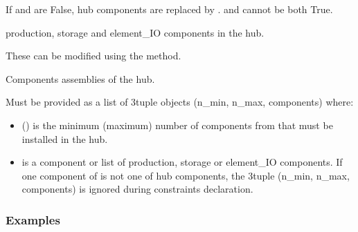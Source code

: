 \documentclass[letterpaper,10pt,english]{sphinxmanual}
\begin{document}
\begin{fulllineitems}
\begin{fulllineitems}
\sphinxAtStartPar
If  and  are False, hub components are replaced by .
 and  cannot be both True.

\end{fulllineitems}


\begin{fulllineitems}
\label{\detokenize{generated/tamos.Hub:tamos.Hub.components}}
\pysigstartsignatures
{}
\pysigstopsignatures
\sphinxAtStartPar
production, storage and element\_IO components in the hub.

\sphinxAtStartPar
These can be modified using the  method.

\end{fulllineitems}


\begin{fulllineitems}
\label{\detokenize{generated/tamos.Hub:tamos.Hub.components_assemblies}}
\pysigstartsignatures
{}
\pysigstopsignatures
\sphinxAtStartPar
Components assemblies of the hub.

\sphinxAtStartPar
Must be provided as a list of 3\sphinxhyphen{}tuple objects (n\_min, n\_max, components) where:
\begin{itemize}
\item {} 
\sphinxAtStartPar
{} () is the minimum (maximum) number of components from  that must be installed in the hub.

\item {} 
\sphinxAtStartPar
{} is a component or list of production, storage or element\_IO components. If one component of  is not one of hub components,
the 3\sphinxhyphen{}tuple (n\_min, n\_max, components) is ignored during constraints declaration.

\end{itemize}
\subsubsection*{Examples}


\end{fulllineitems}
\end{fulllineitems}
\end{document}
